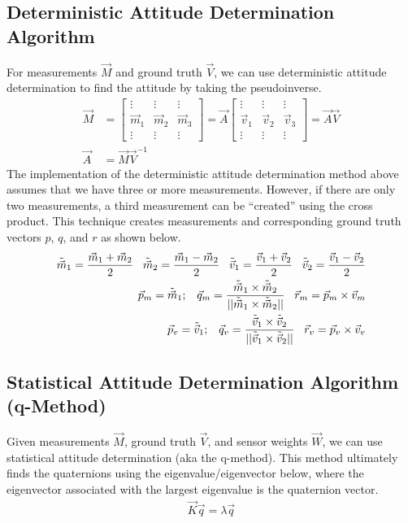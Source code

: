 \subsection{Deterministic Attitude Determination Algorithm}
For measurements $\Vec{M}$ and ground truth $\Vec{V}$, we can use deterministic attitude determination to find the attitude by taking the pseudoinverse.
\begin{align*}
    \Vec{M} &= 
    \begin{bmatrix}
        \vdots & \vdots & \vdots\\
        \Vec{m}_{1} & \Vec{m}_{2} & \Vec{m}_{3}\\
        \vdots & \vdots & \vdots
    \end{bmatrix} =
    \Vec{A} \begin{bmatrix}
        \vdots & \vdots & \vdots\\
        \Vec{v}_{1} & \Vec{v}_{2} & \Vec{v}_{3}\\
        \vdots & \vdots & \vdots
    \end{bmatrix} =
    \Vec{A} \Vec{V} \\
    \Vec{A} &= \Vec{M} \Vec{V}^{-1}
\end{align*}
The implementation of the deterministic attitude determination method above assumes that we have three or more measurements. However, if there are only two measurements, a third measurement can be ``created'' using the cross product. This technique creates measurements and corresponding ground truth vectors $p$, $q$, and $r$ as shown below.
\begin{align*}
    \Tilde{\Vec{{m}}}_1 = \frac{\Vec{m}_1 + \Vec{m}_2}{2} \;\;\;
    \Tilde{\Vec{{m}}}_2 = \frac{\Vec{m}_1 - \Vec{m}_2}{2} \;\;\;
    \Tilde{\Vec{{v}}}_1 = \frac{\Vec{v}_1 + \Vec{v}_2}{2} \;\;\;
    \Tilde{\Vec{{v}}}_2 = \frac{\Vec{v}_1 - \Vec{v}_2}{2} \\
    \Vec{p}_m = \Tilde{\Vec{{m}}}_1; \;\;\;
    \Vec{{q}}_m = \frac{\Tilde{\Vec{{m}}}_1 \times \Tilde{\Vec{{m}}}_2}{||\Tilde{\Vec{{m}}}_1 \times \Tilde{\Vec{{m}}}_2||} \;\;\;
    \Vec{{r}}_m = \Vec{p}_m \times \Vec{v}_m \\
    \Vec{p}_v = \Tilde{\Vec{{v}}}_1; \;\;\;
    \Vec{{q}}_v = \frac{\Tilde{\Vec{{v}}}_1 \times \Tilde{\Vec{{v}}}_2}{||\Tilde{\Vec{{v}}}_1 \times \Tilde{\Vec{{v}}}_2||} \;\;\;
    \Vec{{r}}_v = \Vec{p}_v \times \Vec{v}_v \\
\end{align*}

\subsection{Statistical Attitude Determination Algorithm (q-Method)}
Given measurements $\Vec{M}$, ground truth $\Vec{V}$, and sensor weights $\Vec{W}$, we can use statistical attitude determination (aka the q-method). This method ultimately finds the quaternions using the eigenvalue/eigenvector below, where the eigenvector associated with the largest eigenvalue is the quaternion vector.
\begin{align*}
    \Vec{K} \Vec{q} = \lambda \Vec{q}
\end{align*}

